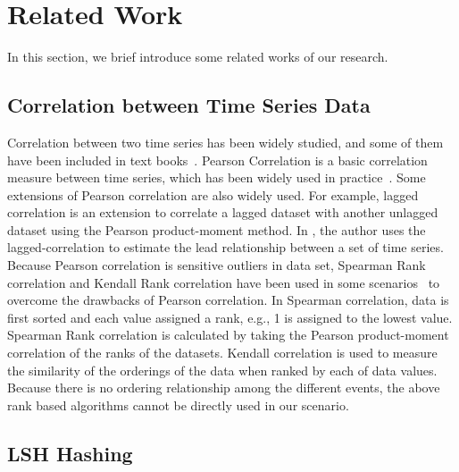 \section{Related Work}
\label{sec:relatedwork}
In this section, we brief introduce some related works of our research.

\subsection{Correlation between Time Series Data}
Correlation between two time series has been widely studied, and some of them have been included in text books~\cite{johnson2002applied}. Pearson Correlation \cite{nagelkerke1991note} is a basic correlation measure between time series, which has been widely used in practice~\cite{Zhu:VLDB:2002}. Some extensions of Pearson correlation are also widely used. For example, lagged correlation is an extension to correlate a lagged dataset with another unlagged dataset using the Pearson product-moment method. In \cite{wu2010detecting}, the author uses the lagged-correlation to estimate the lead relationship between a set of time series. Because Pearson correlation is sensitive outliers in data set, Spearman Rank correlation and Kendall Rank correlation have been used in some scenarios~\cite{Lehman:SAS:2005} to overcome the drawbacks of Pearson correlation. In Spearman correlation, data is first sorted and each value assigned a rank, e.g., 1 is assigned to the lowest value. Spearman Rank correlation is calculated by taking the Pearson product-moment correlation of the ranks of the datasets. Kendall correlation is used to measure the similarity of the orderings of the data when ranked by each of data values. Because there is no ordering relationship among the different events, the above rank based algorithms cannot be directly used in our scenario.

\subsection{LSH Hashing}

